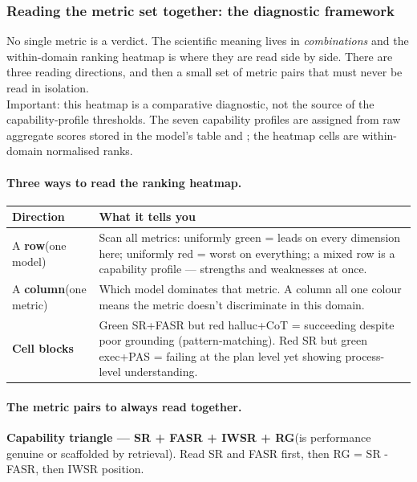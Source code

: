 \subsubsection{Reading the metric set together: the diagnostic framework}

No single metric is a verdict. The scientific meaning lives in \emph{combinations} and the within-domain ranking heatmap is where they are read side by side. There are three reading directions, and then a small set of metric pairs that must never be read in isolation.\\
Important: this heatmap is a comparative diagnostic, not the source of the capability-profile thresholds. The seven capability profiles are assigned from raw aggregate scores stored in the model's  table and ; the heatmap cells are within-domain normalised ranks.

\paragraph{Three ways to read the ranking heatmap.}

\begin{table}[h]\small
\centering
\begin{tabularx}{\linewidth}{@{}l Y@{}}
\toprule
Direction & What it tells you\\
\midrule
A \textbf{row}(one model) & Scan all metrics: uniformly green = leads on every dimension here; uniformly red = worst on everything; a mixed row is a capability profile --- strengths and weaknesses at once.\\
\addlinespace
A \textbf{column}(one metric) & Which model dominates that metric. A column all one colour means the metric doesn't discriminate in this domain.\\
\addlinespace
\textbf{Cell blocks} & Green SR+FASR but red halluc+CoT = succeeding despite poor grounding (pattern-matching). Red SR but green exec+PAS = failing at the plan level yet showing process-level understanding.\\
\bottomrule
\end{tabularx}
\end{table}

\paragraph{The metric pairs to always read together.}

\textbf{Capability triangle --- SR + FASR + IWSR + RG}(is performance genuine or scaffolded by retrieval). Read SR and FASR first, then RG = SR - FASR, then IWSR position.

